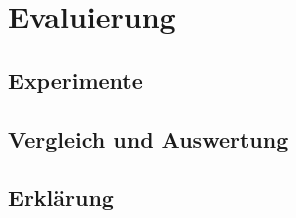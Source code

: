 
\chapter{Evaluierung} 
\label{cha:auswertung}

\section{Experimente} 
\label{sec:experimentwerte}



\section{Vergleich und Auswertung} 
\label{sec:vergleich_und_auswerung}

\section{Erklärung} 
\label{sec:erkl_rung}


